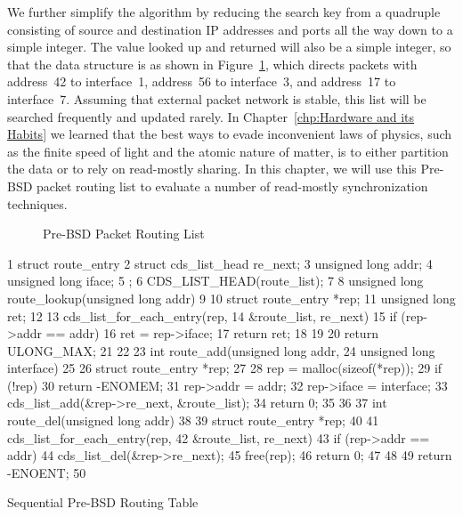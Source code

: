 We further simplify the algorithm by reducing the search key from
a quadruple consisting of source and destination IP addresses and
ports all the way down to a simple integer.
The value looked up and returned will also be a simple integer,
so that the data structure is as shown in
Figure~\ref{fig:defer:Pre-BSD Packet Routing List}, which
directs packets with address~42 to interface~1, address~56 to
interface~3, and address~17 to interface~7.
Assuming that external packet network is stable,
this list will be searched frequently and updated rarely.
In Chapter~\ref{chp:Hardware and its Habits}
we learned that the best ways to evade inconvenient laws of physics, such as
the finite speed of light and the atomic nature of matter, is to
either partition the data or to rely on read-mostly sharing.
In this chapter, we will use this Pre-BSD packet routing
list to evaluate a number of read-mostly synchronization techniques.

\begin{figure}[tb]
\centering
{}
\caption{Pre-BSD Packet Routing List}
\label{fig:defer:Pre-BSD Packet Routing List}
\end{figure}

\begin{listing}[tb]
{ \scriptsize
\begin{verbbox}
 1 struct route_entry {
 2   struct cds_list_head re_next;
 3   unsigned long addr;
 4   unsigned long iface;
 5 };
 6 CDS_LIST_HEAD(route_list);
 7
 8 unsigned long route_lookup(unsigned long addr)
 9 {
10   struct route_entry *rep;
11   unsigned long ret;
12
13   cds_list_for_each_entry(rep,
14                           &route_list, re_next) {
15     if (rep->addr == addr) {
16       ret = rep->iface;
17       return ret;
18     }
19   }
20   return ULONG_MAX;
21 }
22
23 int route_add(unsigned long addr,
24               unsigned long interface)
25 {
26   struct route_entry *rep;
27
28   rep = malloc(sizeof(*rep));
29   if (!rep)
30     return -ENOMEM;
31   rep->addr = addr;
32   rep->iface = interface;
33   cds_list_add(&rep->re_next, &route_list);
34   return 0;
35 }
36
37 int route_del(unsigned long addr)
38 {
39   struct route_entry *rep;
40
41   cds_list_for_each_entry(rep,
42                           &route_list, re_next) {
43     if (rep->addr == addr) {
44       cds_list_del(&rep->re_next);
45       free(rep);
46       return 0;
47     }
48   }
49   return -ENOENT;
50 }
\end{verbbox}
}
\centering
\theverbbox
\caption{Sequential Pre-BSD Routing Table}
\label{lst:defer:Sequential Pre-BSD Routing Table}
\end{listing}

